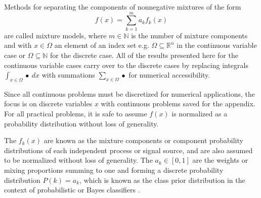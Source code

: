 \documentclass[10pt,letterpaper]{article}
\newcommand{\N}{\mathbb{N}}
\newcommand{\R}{\mathbb{R}}
\begin{document}
Methods for separating the components of nonnegative mixtures of the form
\begin{equation}
f(x) = \sum_{k = 1}^{m} a_k f_k(x)\label{eq:fmm}
\end{equation}
are called mixture models, where $m \in \N$ is the number of mixture components and with $x \in \Omega$ an element of an index set e.g. $\Omega \subseteq \R^n$ in the continuous variable case or $\Omega \subseteq \mathbb{N}$ for the discrete case.
All of the results presented here for the continuous variable cases carry over to the discrete cases by replacing integrals $\displaystyle \int_{x \in \Omega} \bullet\ dx$ with summations $\displaystyle \sum_{x \in \Omega} \bullet $ for numerical accessibility.

Since all continuous problems must be discretized for numerical applications, the focus is on discrete variables $x$ with continuous problems saved for the appendix.
For all practical problems, it is safe to assume $f(x)$ is normalized as a probability distribution without loss of generality.

The $f_k(x)$ are known as the mixture components or component probability distributions of each independent process or signal source, and are also assumed to be normalized without loss of generality.
The $a_k \in [0, 1]$ are the weights or mixing proportions summing to one and forming a discrete probability distribution $P(k) = a_k$, which is known as the class prior distribution in the context of probabilistic or Bayes classifiers \cite{bishop}.
\end{document}

